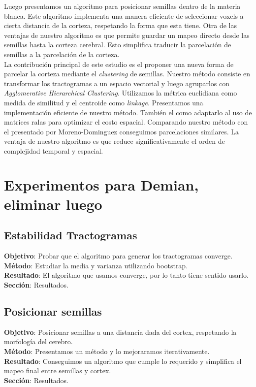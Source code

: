 Luego presentamos un algoritmo para posicionar semillas dentro de la materia 
blanca. Este algoritmo implementa una manera eficiente de seleccionar voxels a 
cierta distancia de la corteza, respetando la forma que esta tiene. Otra de las
ventajas de nuestro algoritmo es que permite guardar un mapeo directo desde las
semillas hasta la corteza cerebral. Esto simplifica traducir la parcelaci\'on 
de semillas a la parcelaci\'on de la corteza. \\

La contribuci\'on principal de este estudio es el proponer una nueva forma 
de parcelar la corteza mediante el \textit{clustering} de semillas. Nuestro
m\'etodo consiste en transformar los tractogramas a un espacio vectorial y luego
agruparlos con \textit{Agglomerative Hierarchical Clustering}. Utilizamos la 
m\'etrica euclidiana como medida de similitud y el centroide como \textit{linkage}.
Presentamos una implementaci\'on eficiente de nuestro m\'etodo. Tambi\'en el 
como adaptarlo al uso de matrices ralas para optimizar el costo espacial.
Comparando nuestro m\'etodo con el presentado por Moreno-Dominguez conseguimos
parcelaciones similares. La ventaja de nuestro algoritmo es que reduce 
significativamente el orden de complejidad temporal y espacial. \\


\section{Experimentos para Demian, eliminar luego}

\subsection{Estabilidad Tractogramas}
\textbf{Objetivo}: Probar que el algoritmo para generar los tractogramas converge.\\
\textbf{M\'etodo}: Estudiar la media y varianza utilizando bootstrap. \\
\textbf{Resultado}: El algoritmo que usamos converge, por lo tanto tiene sentido
                    usarlo.\\
\textbf{Secci\'on}: Resultados.\\
                    
\subsection{Posicionar semillas}
\textbf{Objetivo}:  Posicionar semillas a una distancia
                    dada del cortex, respetando la morfolog\'ia del cerebro. \\
\textbf{M\'etodo}:  Presentamos un m\'etodo y lo mejoraramos iterativamente. \\
\textbf{Resultado}: Conseguimos un algoritmo que cumple lo requerido y simplifica
                    el mapeo final entre semillas y cortex.\\
\textbf{Secci\'on}: Resultados.\\

